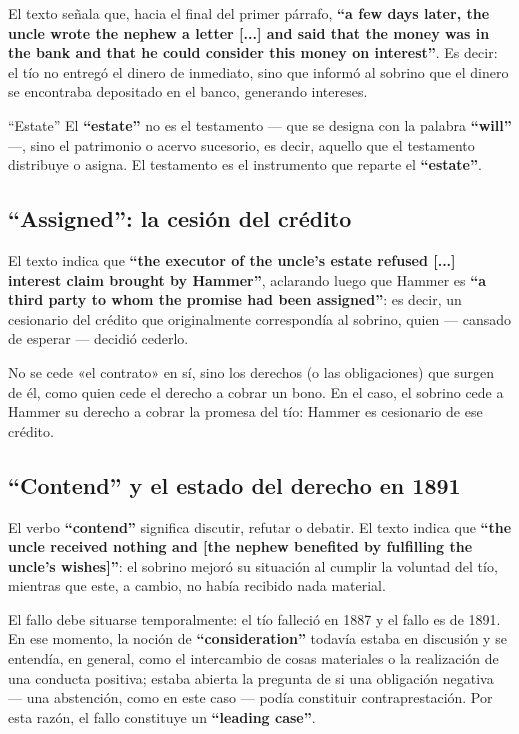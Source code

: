 \documentclass[12pt,oneside]{book}
\begin{document}
El texto señala que, hacia el final del primer párrafo, \textbf{``a few days later, the uncle wrote the nephew a letter [...] and said that the money was in the bank and that he could consider this money on interest''}. Es decir: el tío no entregó el dinero de inmediato, sino que informó al sobrino que el dinero se encontraba depositado en el banco, generando intereses.

\begin{definition}{``Estate''}
El \textbf{``estate''} no es el testamento --- que se designa con la palabra \textbf{``will''} ---, sino el patrimonio o acervo sucesorio, es decir, aquello que el testamento distribuye o asigna. El testamento es el instrumento que reparte el \textbf{``estate''}.
\end{definition}

\subsection{\texorpdfstring{``Assigned'': la cesión del crédito}{Assigned: la cesión del crédito}}

El texto indica que \textbf{``the executor of the uncle's estate refused [...] interest claim brought by Hammer''}, aclarando luego que Hammer es \textbf{``a third party to whom the promise had been assigned''}: es decir, un cesionario del crédito que originalmente correspondía al sobrino, quien --- cansado de esperar --- decidió cederlo.

\begin{note}
No se cede «el contrato» en sí, sino los derechos (o las obligaciones) que surgen de él, como quien cede el derecho a cobrar un bono. En el caso, el sobrino cede a Hammer su derecho a cobrar la promesa del tío: Hammer es cesionario de ese crédito.
\end{note}

\subsection{\texorpdfstring{``Contend'' y el estado del derecho en 1891}{Contend y el estado del derecho en 1891}}

El verbo \textbf{``contend''} significa discutir, refutar o debatir. El texto indica que \textbf{``the uncle received nothing and [the nephew benefited by fulfilling the uncle's wishes]''}: el sobrino mejoró su situación al cumplir la voluntad del tío, mientras que este, a cambio, no había recibido nada material.

El fallo debe situarse temporalmente: el tío falleció en 1887 y el fallo es de 1891. En ese momento, la noción de \textbf{``consideration''} todavía estaba en discusión y se entendía, en general, como el intercambio de cosas materiales o la realización de una conducta positiva; estaba abierta la pregunta de si una obligación negativa --- una abstención, como en este caso --- podía constituir contraprestación. Por esta razón, el fallo constituye un \textbf{``leading case''}.
\end{document}
